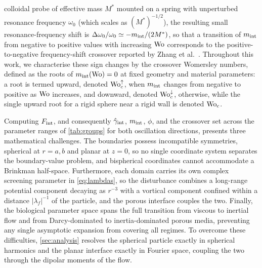 colloidal probe of effective mass $M^*$ mounted on a spring with unperturbed resonance frequency $\omega_0$ (which scales
as $(M^*)^{-1/2}$), the resulting small resonance-frequency shift is $\Delta\omega_0/\omega_0\simeq-m_{\rm int}/(2M^*)$,
so that a transition of $m_{\rm int}$ from negative to positive values with increasing $\mathrm{Wo}$ corresponds to the
positive-to-negative frequency-shift crossover reported by Zhang et al.~\cite{zhang2023unsteady}. Throughout this work,
we characterise these sign changes by the crossover Womersley numbers, defined as the roots of $m_{\rm int}(\mathrm{Wo})=0$ at
fixed geometry and material parameters: a root is termed upward, denoted $\mathrm{Wo}_c^{\uparrow}$, when $m_{\rm int}$ changes
from negative to positive as $\mathrm{Wo}$ increases, and downward, denoted $\mathrm{Wo}_c^{\downarrow}$, otherwise, while the single
upward root for a rigid sphere near a rigid wall is denoted $\mathrm{Wo}_c$.

Computing $F_{\rm int}$, and consequently $\hat\gamma_{\rm int}$, $m_{\rm int}$, $\phi$, and the crossover set across the
parameter ranges of \cref{tab:groups} for both oscillation directions, presents three mathematical challenges. The
boundaries possess incompatible symmetries, spherical at $r=a,b$ and planar at $z=0$, so no single coordinate system
separates the boundary-value problem, and bispherical coordinates cannot accommodate a Brinkman half-space. Furthermore,
each domain carries its own complex screening parameter in \cref{eq:lambdas}, so the disturbance combines a long-range
potential component decaying as $r^{-3}$ with a vortical component confined within a distance $|\lambda_f|^{-1}$ of the
particle, and the porous interface couples the two. Finally, the biological parameter space spans the full transition
from viscous to inertial flow and from Darcy-dominated to inertia-dominated porous media, preventing any single
asymptotic expansion from covering all regimes. To overcome these difficulties, \cref{sec:analysis} resolves the
spherical particle exactly in spherical harmonics and the planar interface exactly in Fourier space, coupling the two
through the dipolar moments of the flow.
